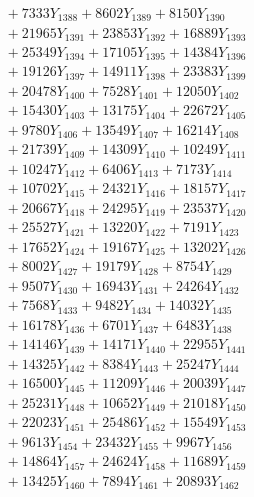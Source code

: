 \documentclass[a4paper,10pt]{article}
\begin{document}
{\begin{align}
&\;  + 7333 Y_{1388} + 8602 Y_{1389} + 8150 Y_{1390} \\[0.3ex]
&\;  + 21965 Y_{1391} + 23853 Y_{1392} + 16889 Y_{1393} \\[0.3ex]
&\;  + 25349 Y_{1394} + 17105 Y_{1395} + 14384 Y_{1396} \\[0.3ex]
&\;  + 19126 Y_{1397} + 14911 Y_{1398} + 23383 Y_{1399} \\[0.3ex]
&\;  + 20478 Y_{1400} + 7528 Y_{1401} + 12050 Y_{1402} \\[0.3ex]
&\;  + 15430 Y_{1403} + 13175 Y_{1404} + 22672 Y_{1405} \\[0.3ex]
&\;  + 9780 Y_{1406} + 13549 Y_{1407} + 16214 Y_{1408} \\[0.5ex]\allowbreak
&\;  + 21739 Y_{1409} + 14309 Y_{1410} + 10249 Y_{1411} \\[0.3ex]
&\;  + 10247 Y_{1412} + 6406 Y_{1413} + 7173 Y_{1414} \\[0.3ex]
&\;  + 10702 Y_{1415} + 24321 Y_{1416} + 18157 Y_{1417} \\[0.3ex]
&\;  + 20667 Y_{1418} + 24295 Y_{1419} + 23537 Y_{1420} \\[0.3ex]
&\;  + 25527 Y_{1421} + 13220 Y_{1422} + 7191 Y_{1423} \\[0.3ex]
&\;  + 17652 Y_{1424} + 19167 Y_{1425} + 13202 Y_{1426} \\[0.3ex]
&\;  + 8002 Y_{1427} + 19179 Y_{1428} + 8754 Y_{1429} \\[0.3ex]
&\;  + 9507 Y_{1430} + 16943 Y_{1431} + 24264 Y_{1432} \\[0.3ex]
&\;  + 7568 Y_{1433} + 9482 Y_{1434} + 14032 Y_{1435} \\[0.3ex]
&\;  + 16178 Y_{1436} + 6701 Y_{1437} + 6483 Y_{1438} \\[0.5ex]\allowbreak
&\;  + 14146 Y_{1439} + 14171 Y_{1440} + 22955 Y_{1441} \\[0.3ex]
&\;  + 14325 Y_{1442} + 8384 Y_{1443} + 25247 Y_{1444} \\[0.3ex]
&\;  + 16500 Y_{1445} + 11209 Y_{1446} + 20039 Y_{1447} \\[0.3ex]
&\;  + 25231 Y_{1448} + 10652 Y_{1449} + 21018 Y_{1450} \\[0.3ex]
&\;  + 22023 Y_{1451} + 25486 Y_{1452} + 15549 Y_{1453} \\[0.3ex]
&\;  + 9613 Y_{1454} + 23432 Y_{1455} + 9967 Y_{1456} \\[0.3ex]
&\;  + 14864 Y_{1457} + 24624 Y_{1458} + 11689 Y_{1459} \\[0.3ex]
&\;  + 13425 Y_{1460} + 7894 Y_{1461} + 20893 Y_{1462} \\[0.3ex]

\end{align}}
\end{document}
